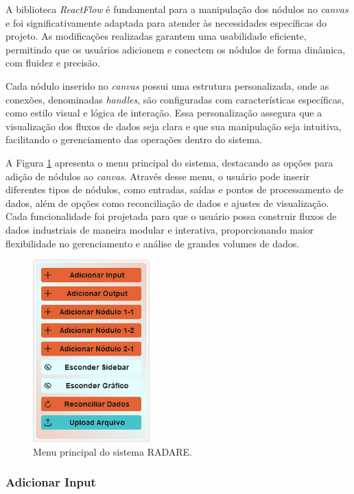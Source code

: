 A biblioteca \textit{ReactFlow} \cite{reactflow} é fundamental para a manipulação dos nódulos no \textit{canvas} e foi significativamente adaptada para atender às necessidades específicas do projeto. As modificações realizadas garantem uma usabilidade eficiente, permitindo que os usuários adicionem e conectem os nódulos de forma dinâmica, com fluidez e precisão.

Cada nódulo inserido no \textit{canvas} possui uma estrutura personalizada, onde as conexões, denominadas \textit{handles}, são configuradas com características específicas, como estilo visual e lógica de interação. Essa personalização assegura que a visualização dos fluxos de dados seja clara e que sua manipulação seja intuitiva, facilitando o gerenciamento das operações dentro do sistema.

A Figura \ref{Fig:MenuImage} apresenta o menu principal do sistema, destacando as opções para adição de nódulos ao \textit{canvas}. Através desse menu, o usuário pode inserir diferentes tipos de nódulos, como entradas, saídas e pontos de processamento de dados, além de opções como reconciliação de dados e ajustes de visualização. Cada funcionalidade foi projetada para que o usuário possa construir fluxos de dados industriais de maneira modular e interativa, proporcionando maior flexibilidade no gerenciamento e análise de grandes volumes de dados.

\begin{figure}[htbp]
    \centering
    \includegraphics[width=0.4\textwidth]{figuras/menu-image.png}
    \caption{Menu principal do sistema RADARE.}
    \label{Fig:MenuImage}
\end{figure}

\subsubsection{Adicionar Input}


